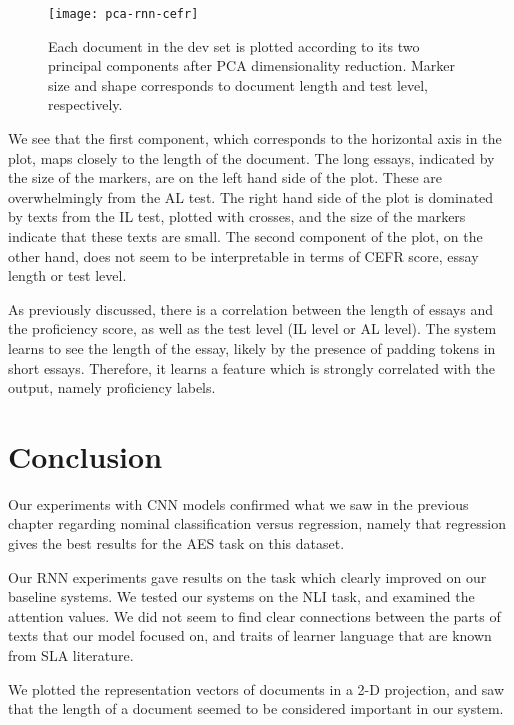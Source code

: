 \begin{figure}
  \centering
  \texttt{[image: pca-rnn-cefr]}
  \caption[PCA plot of the vector representations of documents]{
    Each document in the dev set is plotted according to its two principal
    components after PCA dimensionality reduction. Marker size and shape
    corresponds to document length and test level, respectively.
  }
  \label{fig:pca-rnn-cefr}
\end{figure}

We see that the first component, which corresponds to the horizontal axis in
the plot, maps closely to the length of the document. The long essays,
indicated by the size of the markers, are on the left hand side of the plot.
These are overwhelmingly from the AL test. The right hand side of the plot is
dominated by texts from the IL test, plotted with crosses, and the size of
the markers indicate that these texts are small. The second component of the
plot, on the other hand, does not seem to be interpretable in terms of CEFR
score, essay length or test level.

As previously discussed, there is a correlation between the length of essays
and the proficiency score, as well as the test level (IL level or AL level).
The system learns to see the length of the essay, likely by the presence of
padding tokens in short essays. Therefore, it learns a feature which is
strongly correlated with the output, namely proficiency labels.


\section{Conclusion}

Our experiments with \ac{CNN} models confirmed what we saw in the previous
chapter regarding nominal classification versus regression, namely that
regression gives the best results for the \ac{AES} task on this dataset.

Our \ac{RNN} experiments gave results on the task which clearly improved on
our baseline systems. We tested our systems on the NLI task, and examined the
attention values. We did not seem to find clear connections between the parts
of texts that our model focused on, and traits of learner language that are
known from \ac{SLA} literature.

We plotted the representation vectors of documents in a 2-D projection, and
saw that the length of a document seemed to be considered important in our
system.

